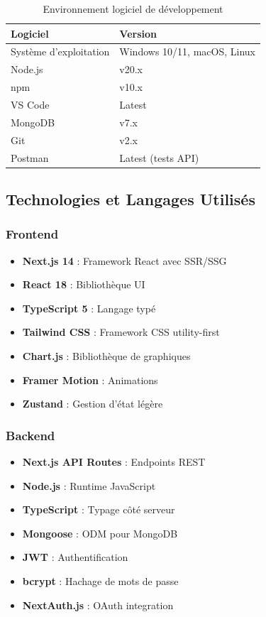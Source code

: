 \begin{table}[H]
\centering
\caption{Environnement logiciel de développement}
\label{tab:env-logiciel}
\begin{tabular}{|l|l|}
\hline
\textbf{Logiciel} & \textbf{Version} \\
\hline
Système d'exploitation & Windows 10/11, macOS, Linux \\
\hline
Node.js & v20.x \\
\hline
npm & v10.x \\
\hline
VS Code & Latest \\
\hline
MongoDB & v7.x \\
\hline
Git & v2.x \\
\hline
Postman & Latest (tests API) \\
\hline
\end{tabular}
\end{table}

\subsection{Technologies et Langages Utilisés}

\subsubsection{Frontend}

\begin{itemize}
    \item \textbf{Next.js 14} : Framework React avec SSR/SSG
    \item \textbf{React 18} : Bibliothèque UI
    \item \textbf{TypeScript 5} : Langage typé
    \item \textbf{Tailwind CSS} : Framework CSS utility-first
    \item \textbf{Chart.js} : Bibliothèque de graphiques
    \item \textbf{Framer Motion} : Animations
    \item \textbf{Zustand} : Gestion d'état légère
\end{itemize}

\subsubsection{Backend}

\begin{itemize}
    \item \textbf{Next.js API Routes} : Endpoints REST
    \item \textbf{Node.js} : Runtime JavaScript
    \item \textbf{TypeScript} : Typage côté serveur
    \item \textbf{Mongoose} : ODM pour MongoDB
    \item \textbf{JWT} : Authentification
    \item \textbf{bcrypt} : Hachage de mots de passe
    \item \textbf{NextAuth.js} : OAuth integration
\end{itemize}

